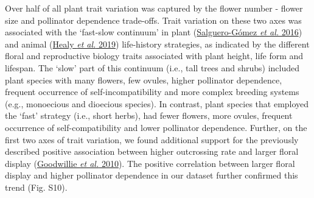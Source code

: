 \documentclass[
  12pt,
  a4paper,
]{article}
\begin{document}
Over half of all plant trait variation was captured by the flower number - flower size and pollinator dependence trade-offs. Trait variation on these two axes was associated with the `fast-slow continuum' in plant (\protect\hyperlink{ref-salguero2016}{Salguero-Gómez \emph{et al.} 2016}) and animal (\protect\hyperlink{ref-healy2019}{Healy \emph{et al.} 2019}) life-history strategies, as indicated by the different floral and reproductive biology traits associated with plant height, life form and lifespan. The `slow' part of this continuum (i.e., tall trees and shrubs) included plant species with many flowers, few ovules, higher pollinator dependence, frequent occurrence of self-incompatibility and more complex breeding systems (e.g., monoecious and dioecious species). In contrast, plant species that employed the `fast' strategy (i.e., short herbs), had fewer flowers, more ovules, frequent occurrence of self-compatibility and lower pollinator dependence. Further, on the first two axes of trait variation, we found additional support for the previously described positive association between higher outcrossing rate and larger floral display (\protect\hyperlink{ref-goodwillie2010}{Goodwillie \emph{et al.} 2010}). The positive correlation between larger floral display and higher pollinator dependence in our dataset further confirmed this trend (Fig. S10).
\end{document}
